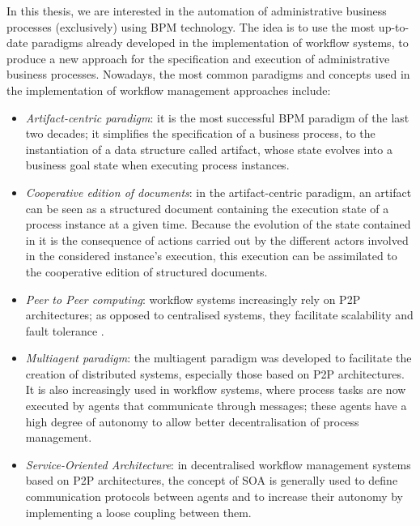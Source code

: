 \label{chap0:sec:thesis-challenge}
In this thesis, we are interested in the automation of administrative business processes (exclusively) using BPM technology. The idea is to use the most up-to-date paradigms already developed in the implementation of workflow systems, to produce a new approach for the specification and execution of administrative business processes. Nowadays, the most common paradigms and concepts used in the implementation of workflow management approaches include:
\begin{itemize}
	\item \textit{Artifact-centric paradigm}: it is the most successful BPM paradigm of the last two decades; it simplifies the specification of a business process, to the instantiation of a data structure called artifact, whose state evolves into a business goal state when executing process instances.
	\item \textit{Cooperative edition of documents}: in the artifact-centric paradigm, an artifact can be seen as a structured document containing the execution state of a process instance at a given time. Because the evolution of the state contained in it is the consequence of actions carried out by the different actors involved in the considered instance's execution, this execution can be assimilated to the cooperative edition of structured documents.
	\item \textit{Peer to Peer computing}: workflow systems increasingly rely on P2P architectures; as opposed to centralised systems, they facilitate scalability and fault tolerance \cite{fakas04, junYan06, theseMounir}.
	\item \textit{Multiagent paradigm}: the multiagent paradigm was developed to facilitate the creation of distributed systems, especially those based on P2P architectures. It is also increasingly used in workflow systems, where process tasks are now executed by agents that communicate through messages; these agents have a high degree of autonomy to allow better decentralisation of process management.
	\item \textit{Service-Oriented Architecture}: in decentralised workflow management systems based on P2P architectures, the concept of SOA is generally used to define communication protocols between agents and to increase their autonomy by implementing a loose coupling between them.
\end{itemize}

